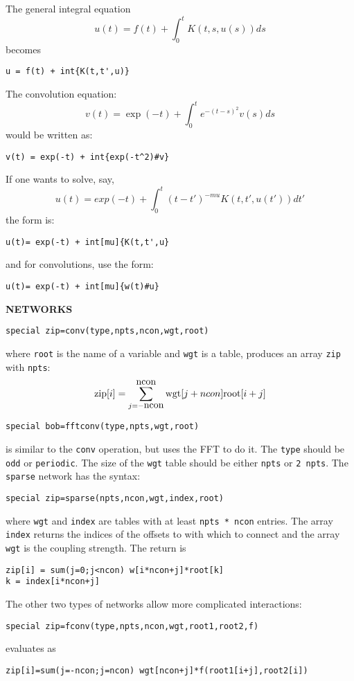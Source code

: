 The general integral equation
\[
	u(t)=f(t)+\int_0^t K(t,s,u(s))ds
\]
becomes
\begin{verbatim}
u = f(t) + int{K(t,t',u)}
\end{verbatim}
The convolution equation:
\[
 v(t) = \exp(-t) + \int_0^t e^{-(t-s)^2}v(s) ds
\]
would be written as:
\begin{verbatim}
v(t) = exp(-t) + int{exp(-t^2)#v}
\end{verbatim}
If one wants to solve, say,
\[
 u(t) = exp(-t) + \int^t_0 (t-t')^{-mu} K(t,t',u(t'))dt'
\]
the form is:
\begin{verbatim}
u(t)= exp(-t) + int[mu]{K(t,t',u}
\end{verbatim}
and for convolutions, use the form:
\begin{verbatim}
u(t)= exp(-t) + int[mu]{w(t)#u}
\end{verbatim}
\noindent
{\bf NETWORKS}
\begin{verbatim}
special zip=conv(type,npts,ncon,wgt,root)
\end{verbatim}
where {\tt root} is the name of a variable and {\tt wgt} is a table,
produces an array {\tt zip} with {\tt npts}:
\[
\hbox{zip}[i] =\sum_{j=-\hbox{ncon}}^{\hbox{ncon}}\hbox{wgt}[j+ncon]
\hbox{root}[i+j] 
\]
\begin{verbatim}
special bob=fftconv(type,npts,wgt,root)
\end{verbatim}
is similar to the {\tt conv} operation, but uses the FFT to do it. The {\tt type} should be {\tt odd} or {\tt periodic}. The size of the {\tt wgt} table should be either {\tt npts} or {\tt 2 npts}.
The {\tt sparse} network has the syntax:
\begin{verbatim}
special zip=sparse(npts,ncon,wgt,index,root)
\end{verbatim}
where {\tt wgt} and {\tt index} are tables with at least {\tt npts *
ncon} entries.   The array {\tt index} returns the indices of the
offsets to with which to connect and the array {\tt wgt} is the
coupling strength. The return is
\begin{verbatim}
zip[i] = sum(j=0;j<ncon) w[i*ncon+j]*root[k]
k = index[i*ncon+j] 
\end{verbatim}
The other two types of networks allow more complicated interactions:
\begin{verbatim}
special zip=fconv(type,npts,ncon,wgt,root1,root2,f)
\end{verbatim}
evaluates as 
\begin{verbatim}
zip[i]=sum(j=-ncon;j=ncon) wgt[ncon+j]*f(root1[i+j],root2[i])
\end{verbatim}
